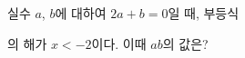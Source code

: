 실수 $a$, $b$에 대하여 $2a+b=0$일 때, 부등식\par\smallskip{}\par\smallskip\noindent 의 해가 $x<-2$이다. 이때 $ab$의 값은?
